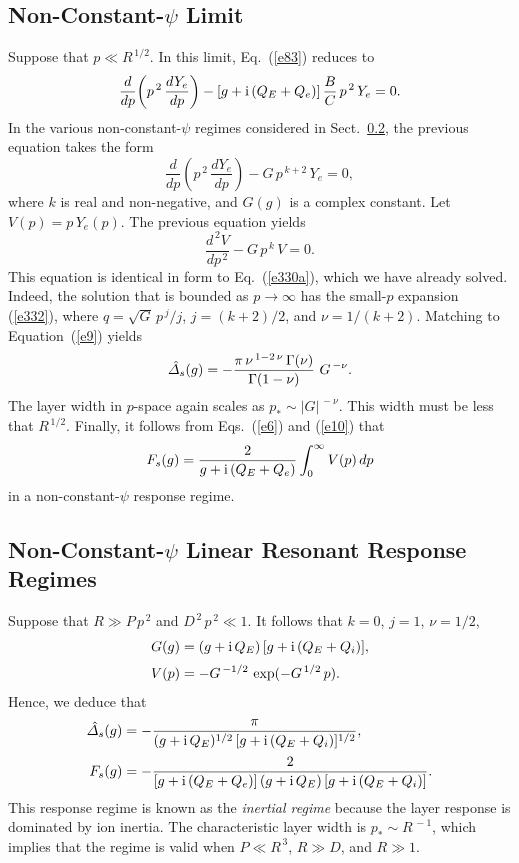 \documentclass[titlepage=false,12pt]{article}
\begin{document}
\subsection{Non-Constant-$\psi$ Limit}\label{sncp}
Suppose that $p\ll R^{\,1/2}$. In this limit, Eq.~(\ref{e83}) reduces to 
\begin{equation}
\frac{d}{d p}\!\left(p^{\,2}\,\frac{d Y_e}{d p}\right)-[g+{\rm i}\,(Q_E+Q_e)]\,\frac{B}{C}\,p^{\,2}\,Y_e=0.
\end{equation}
In the various non-constant-$\psi$ regimes considered in Sect.~\ref{snonc}, the previous equation takes the form
\begin{equation}
\frac{d}{d p}\!\left(p^{\,2}\,\frac{d Y_e}{d p}\right)-G\,p^{\,k+2}\,Y_e = 0,
\end{equation}
where $k$ is real and non-negative, and $G(g)$ is a complex constant. Let $V(p)=p\,Y_e(p)$. The previous equation
yields
\begin{equation}
\frac{d^{\,2} V}{d p^{\,2}} - G\,p^{\,k}\,V = 0.
\end{equation}
This equation is identical in form to Eq.~(\ref{e330a}), which we have already solved. Indeed, the solution that
is bounded as $p\rightarrow\infty$ has the small-$p$ expansion (\ref{e332}), where $q=\!\sqrt{G}\,p^{\,j}/j$, 
$j=(k+2)/2$, and $\nu=1/(k+2)$. Matching to Equation~(\ref{e9}) yields
\begin{equation}
\hat{\mit\Delta}_s(g)= -\frac{\pi\,\nu^{\,1-2\,\nu}\,\Gamma(\nu)}{\Gamma(1-\nu)}\,\,G^{\,-\nu}.
\end{equation}
The layer width in $p$-space again scales as $p_\ast\sim |G|^{\,-\nu}$. This width must be
less that $R^{\,1/2}$.  
Finally, it follows from Eqs.~(\ref{e6}) and (\ref{e10}) that
\begin{equation}
F_s(g) = \frac{2}{g+{\rm i}\,(Q_E+Q_e)}\int_0^\infty V(p)\,dp
\end{equation}
in a non-constant-$\psi$ response regime. 

\subsection{Non-Constant-$\psi$ Linear Resonant Response Regimes}\label{snonc}
Suppose that $R\gg P\,p^{\,2}$ and $D^{\,2}\,p^{\,2} \ll 1$. It follows that $k=0$, $j=1$, $\nu=1/2$, 
\begin{align}
G(g) &= (g+{\rm i}\,Q_E)\,[g+{\rm i}\,(Q_E+Q_i)],\\[0.5ex]
V(p)&= -G^{\,-1/2}\,\exp(-G^{\,1/2}\,p).
\end{align}
Hence, we deduce that
\begin{align}\label{eia}
\hat{\mit\Delta}_s(g) &= -\frac{\pi}{(g+{\rm i}\,Q_E)^{1/2}\,[g+{\rm i}\,(Q_E+Q_i)]^{1/2}},\\[0.5ex]
F_s(g)&= - \frac{2}{[g+{\rm i}\,(Q_E+Q_e)]\,(g+{\rm i}\,Q_E)\,[g+{\rm i}\,(Q_E+Q_i)]}.\label{eib}
\end{align}
This response regime is known as the {\em inertial regime} because the layer response is dominated by
 ion inertia. The characteristic layer width is $p_\ast \sim R^{\,-1}$,
which implies that the regime is valid when $P\ll R^{\,3}$, $R\gg D$, and $R\gg 1$. 
\end{document}
